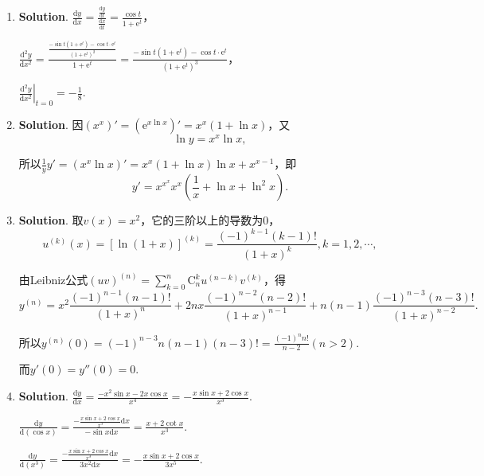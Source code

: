 \documentclass[../Main.tex]{subfiles}
\begin{document}
\begin{enumerate}
    \item \textbf{Solution}. $\frac{\mathrm{d}y}{\mathrm{d}x}=\frac{\frac{\mathrm{d}y}{\mathrm{d}t}}{\frac{\mathrm{d}x}{\mathrm{d}t}}
      =\frac{\cos t}{1+\mathrm{e}^{t}}$，

      $\frac{\mathrm{d}^{2} y}{\mathrm{d}x^{2}}=\frac{\frac{-\sin t\left(1+\mathrm{e}^{t}\right)-\cos
      t\cdot\mathrm{e}^{t}}{\left(1+\mathrm{e}^{t}\right)^{2}}}{1+\mathrm{e}^{t}}
      =\frac{-\sin t\left(1+\mathrm{e}^{t}\right)-\cos t\cdot\mathrm{e}^{t}}{\left(1+\mathrm{e}^{t}\right)^{3}}$，

      $\left.\frac{\mathrm{d}^{2} y}{\mathrm{d}x^{2}}\right|_{t=0}=-\frac{1}{8}$.

    \item \textbf{Solution}. 因$\left(x^{x}\right)'=\left(\mathrm{e}^{x\ln x}\right
      )'=x^{x}(1+\ln x)$，又
      \[
        \ln y=x^{x}\ln x,
      \]

      所以$\frac{1}{y}y'=\left(x^{x}\ln x\right)'=x^{x}(1+\ln x)\ln x+x^{x-1}$，即
      \[
        y'=x^{x^x}x^{x}\left(\frac{1}{x}+\ln x+\ln^{2} x\right).
      \]

    \item \textbf{Solution}. 取$v(x)=x^{2}$，它的三阶以上的导数为0，
      \[
        u^{(k)}(x)=\left[\ln(1+x)\right]^{(k)}=\frac{(-1)^{k-1}(k-1)!}{(1+x)^{k}}
        ,k=1,2,\cdots,
      \]

      由Leibniz公式$(uv)^{(n)}=\sum_{k=0}^{n}\mathrm{C}_{n}^{k}u^{(n-k)}v^{(k)}$，得
      \[
        y^{(n)}=x^{2}\frac{(-1)^{n-1}(n-1)!}{(1+x)^{n}}+2nx\frac{(-1)^{n-2}(n-2)!}{(1+x)^{n-1}}
        +n(n-1)\frac{(-1)^{n-3}(n-3)!}{(1+x)^{n-2}}.
      \]

      所以$y^{(n)}(0)=(-1)^{n-3}n(n-1)(n-3)!=\frac{(-1)^{n}n!}{n-2}(n>2)$.

      而$y'(0)=y''(0)=0$.

    \item \textbf{Solution}. $\frac{\mathrm{d}y}{\mathrm{d}x}=\frac{-x^{2}\sin x-2x\cos
      x}{x^{4}}=-\frac{x\sin x+2\cos x}{x^{3}}$.

      $\frac{\mathrm{d}y}{\mathrm{d}(\cos x)}=\frac{-\frac{x\sin x+2\cos x}{x^{3}}\mathrm{d}x}{-\sin
      x\mathrm{d}x}=\frac{x+2\cot x}{x^{3}}$.

      $\frac{\mathrm{d}y}{\mathrm{d}(x^{3})}=\frac{-\frac{x\sin x+2\cos x}{x^{3}}\mathrm{d}x}{3x^{2}\mathrm{d}x}
      =-\frac{x\sin x+2\cos x}{3x^{5}}$.
  \end{enumerate}
\end{document}
